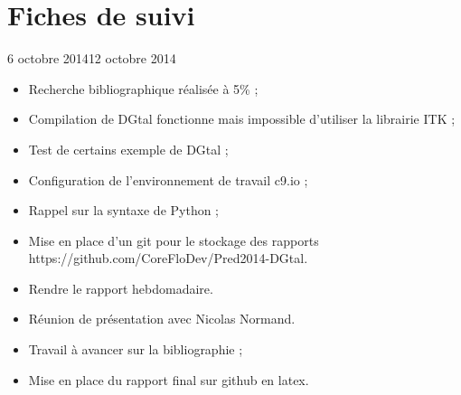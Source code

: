 \documentclass[11pt, french, screen]{report-rd-info}
\begin{document}
\chapter{Fiches de suivi}
\label{ann:FichesSuivi}

\begin{fichesuivi}{6 octobre 2014}{12 octobre 2014}

	\begin{travaileffectue}
		\begin{itemize}
            \item Recherche bibliographique réalisée à 5\% ;
            \item Compilation de DGtal fonctionne mais impossible d'utiliser la librairie ITK ;
            \item Test de certains exemple de DGtal ;
            \item Configuration de l'environnement de travail c9.io ;
            \item Rappel sur la syntaxe de Python ;
            \item Mise en place d'un git pour le stockage des rapports https://github.com/CoreFloDev/Pred2014-DGtal.
		\end{itemize}
	\end{travaileffectue}

	\begin{travailnoneffectue}
		\begin{itemize}
			\item Rendre le rapport hebdomadaire.
		\end{itemize}
	\end{travailnoneffectue}

	\begin{echange}
		\begin{itemize}
			\item Réunion de présentation avec Nicolas Normand.
		\end{itemize}
	\end{echange}

	\begin{planification}
		\begin{itemize}
			\item Travail à avancer sur la bibliographie ;
            \item Mise en place du rapport final sur github en latex.
		\end{itemize}
	\end{planification}
\end{fichesuivi}
\end{document}
